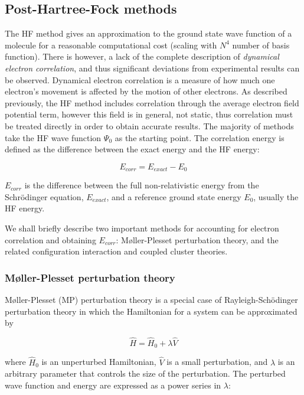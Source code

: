 \subsection{Post-Hartree-Fock methods}

The HF method gives an approximation to the ground state wave function of a
molecule for a reasonable computational cost (scaling with $N^4$ number of basis
function). There is however, a lack of the complete description of
\emph{dynamical electron correlation},\cite{Cramer2004} and thus significant
deviations from experimental results can be observed. Dynamical electron
correlation is a measure of how much one electron's movement is affected by the
motion of other electrons. As described previously, the HF method includes
correlation through the average electron field potential term, however this
field is in general, not static, thus correlation must be treated directly in
order to obtain accurate results. The majority of methods take the HF wave
function $\Psi_0$ as the starting point. The correlation energy is defined as
the difference between the exact energy and the HF energy:

\begin{equation}
  E_{corr} = E_{exact} - E_0
\end{equation}

\noindent $E_{corr}$ is the difference between the full non-relativistic energy
from the Schr{\"o}dinger equation, $E_{exact}$, and a reference ground state
energy $E_0$, usually the HF energy.

We shall briefly describe two important methods for accounting for electron
correlation and obtaining $E_{corr}$: M{\o}ller-Plesset perturbation theory,
and the related configuration interaction and coupled cluster theories.

\subsubsection{M{\o}ller-Plesset perturbation theory}

M{\o}ller-Plesset (MP) perturbation theory is a special case of
Rayleigh-Sch{\"o}dinger perturbation theory in which the Hamiltonian for a
system can be approximated by

\begin{equation}
  \hat{H} = \hat{H}_0 + \lambda\hat{V}
\end{equation}

\noindent where $\hat{H}_0$ is an unperturbed Hamiltonian, $\hat{V}$ is a small
perturbation, and $\lambda$ is an arbitrary parameter that controls the size
of the perturbation. The perturbed wave function and energy are expressed as a
power series in $\lambda$:

